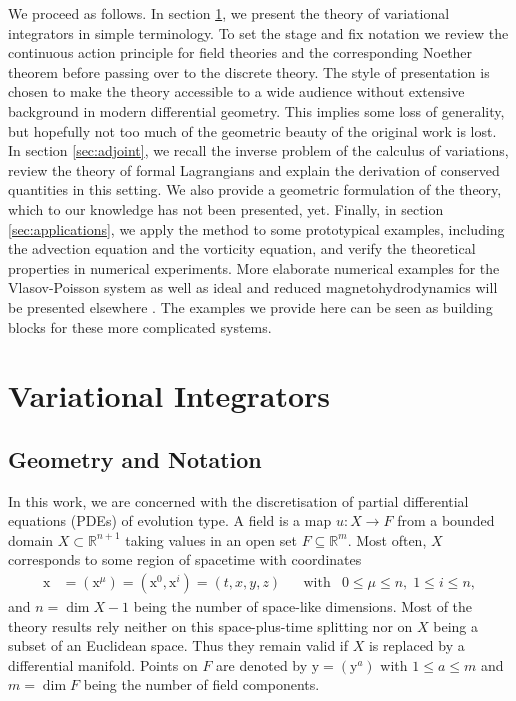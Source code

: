 \documentclass[12pt,a4paper,reqno]{article}
\begin{document}
We proceed as follows. In section \ref{sec:vi}, we present the theory of variational integrators in simple terminology. To set the stage and fix notation we review the continuous action principle for field theories and the corresponding Noether theorem before passing over to the discrete theory. The style of presentation is chosen to make the theory accessible to a wide audience without extensive background in modern differential geometry. This implies some loss of generality, but hopefully not too much of the geometric beauty of the original work is lost.
In section \ref{sec:adjoint}, we recall the inverse problem of the calculus of variations, review the theory of formal Lagrangians and explain the derivation of conserved quantities in this setting. We also provide a geometric formulation of the theory, which to our knowledge has not been presented, yet.
Finally, in section \ref{sec:applications}, we apply the method to some prototypical examples, including the advection equation and the vorticity equation, and verify the theoretical properties in numerical experiments.
More elaborate numerical examples for the Vlasov-Poisson system as well as ideal and reduced magnetohydrodynamics will be presented elsewhere \cite{KrausMajSonnendruecker:2015, KrausSquireMaj:2015, KrausTassi:2015}.
The examples we provide here can be seen as building blocks for these more complicated systems.

\section{Variational Integrators}
\label{sec:vi}

\subsection{Geometry and Notation}

In this work, we are concerned with the discretisation of partial differential equations (PDEs) of evolution type.
A field is a map ${\ensuremath{{\ensuremath{{u}}}}} : X \rightarrow F$ from a bounded domain $X \subset \mathbb{R}^{n+1}$ taking values in an open set $F \subseteq \mathbb{R}^{m}$.
Most often, $X$ corresponds to some region of spacetime with coordinates
\begin{align*}
{\ensuremath{{\ensuremath{\mathrm{{x}}}}}}
&= ({\ensuremath{{\ensuremath{\mathrm{{x}}}}}}^{\mu})
= ({\ensuremath{{\ensuremath{\mathrm{{x}}}}}}^{0}, {\ensuremath{{\ensuremath{\mathrm{{x}}}}}}^{i})
= ({\ensuremath{{\ensuremath{{t}}}}}, {\ensuremath{{\ensuremath{{x}}}}}, {\ensuremath{{\ensuremath{{y}}}}}, {\ensuremath{{\ensuremath{{z}}}}}) &
& \text{with} &
0 \leq \mu \leq n , \;
1 \leq i \leq n ,
\end{align*}
and $n = \dim{X} - 1$ being the number of space-like dimensions.
Most of the theory results rely neither on this space-plus-time splitting nor on $X$ being a subset of an Euclidean space. Thus they remain valid if $X$ is replaced by a differential manifold.
Points on $F$ are denoted by ${\ensuremath{{\ensuremath{\mathrm{{y}}}}}} = ({\ensuremath{{\ensuremath{\mathrm{{y}}}}}}^{a})$ with $1 \leq a \leq m$ and $m = \dim{F}$ being the number of field components.
\end{document}
